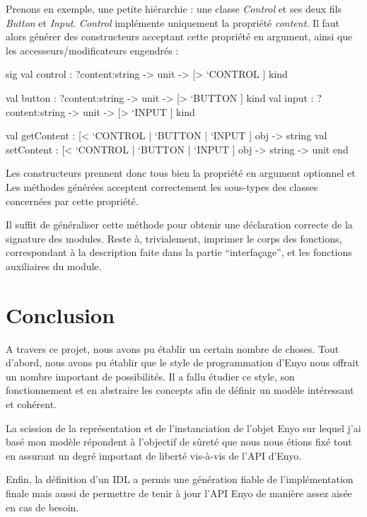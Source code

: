\documentclass[11pt,a4paper]{report}
\begin{document}
Prenons en exemple, une petite hiérarchie : une classe \emph{Control} et ses deux fils \emph{Button} et \emph{Input}. 
\emph{Control} implémente uniquement la propriété \emph{content}. Il faut alors générer des constructeurs
acceptant cette propriété en argument, ainsi que les accesseurs/modificateurs engendrés :

\begin{OCaml}
sig
  val control : ?content:string -> unit -> [> `CONTROL ] kind

  val button : ?content:string -> unit -> [> `BUTTON ] kind
  val input : ?content:string -> unit -> [> `INPUT ] kind

  val getContent : [< `CONTROL | `BUTTON | `INPUT ] obj -> string
  val setContent : [< `CONTROL | `BUTTON | `INPUT ] obj -> string -> unit
end
\end{OCaml}

Les constructeurs prennent donc tous bien la propriété en argument optionnel et
Les méthodes générées acceptent correctement les sous-types des classes concernées par cette propriété.

Il suffit de généraliser cette méthode pour obtenir une déclaration correcte de la signature des modules.
Reste à, trivialement, imprimer le corps des fonctions, correspondant à la description faite dans la partie ``interfaçage'',
et les fonctions auxiliaires du module.



\chapter{Conclusion}

A travers ce projet, nous avons pu établir un certain nombre de choses.
Tout d'abord, nous avons pu établir que le style de programmation d'Enyo nous offrait
un nombre important de possibilités. Il a fallu étudier ce style, son fonctionnement et 
en abstraire les concepts afin de définir un modèle intéressant et cohérent.

La scission de la représentation et de l'instanciation de l'objet Enyo sur lequel j'ai basé mon modèle
répondent à l'objectif de sûreté que nous nous étions fixé tout en assurant un degré important
de liberté vis-à-vis de l'API d'Enyo.

Enfin, la définition d'un IDL a permis une génération fiable de l'implémentation finale mais aussi de 
permettre de tenir à jour l'API Enyo de manière assez aisée en cas de besoin.
\end{document}
